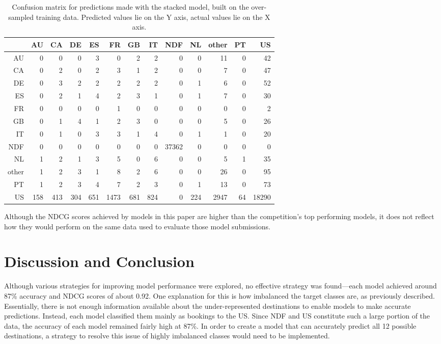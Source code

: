 \documentclass{article}
\begin{document}
\begin{table}[ht]
\centering
\begin{tabular}{r | rrrrrrrrrrrr}
 & AU & CA & DE & ES & FR & GB & IT & NDF & NL & other & PT & US \\ 
  \hline
  AU &   0 &   0 &   0 &   3 &   0 &   2 &   2 &   0 &   0 &  11 &   0 &  42 \\ 
  CA &   0 &   2 &   0 &   2 &   3 &   1 &   2 &   0 &   0 &   7 &   0 &  47 \\ 
  DE &   0 &   3 &   2 &   2 &   2 &   2 &   2 &   0 &   1 &   6 &   0 &  52 \\ 
  ES &   0 &   2 &   1 &   4 &   2 &   3 &   1 &   0 &   1 &   7 &   0 &  30 \\ 
  FR &   0 &   0 &   0 &   0 &   1 &   0 &   0 &   0 &   0 &   0 &   0 &   2 \\ 
  GB &   0 &   1 &   4 &   1 &   2 &   3 &   0 &   0 &   0 &   5 &   0 &  26 \\ 
  IT &   0 &   1 &   0 &   3 &   3 &   1 &   4 &   0 &   1 &   1 &   0 &  20 \\ 
  NDF &   0 &   0 &   0 &   0 &   0 &   0 &   0 & 37362 &   0 &   0 &   0 &   0 \\ 
  NL &   1 &   2 &   1 &   3 &   5 &   0 &   6 &   0 &   0 &   5 &   1 &  35 \\ 
  other &   1 &   2 &   3 &   1 &   8 &   2 &   6 &   0 &   0 &  26 &   0 &  95 \\ 
  PT &   1 &   2 &   3 &   4 &   7 &   2 &   3 &   0 &   1 &  13 &   0 &  73 \\ 
  US & 158 & 413 & 304 & 651 & 1473 & 681 & 824 &   0 & 224 & 2947 &  64 & 18290 \\
\end{tabular}
\caption{Confusion matrix for predictions made with the stacked model, built on the over-sampled training data. Predicted values lie on the Y axis, actual values lie on the X axis.}
\label{cm:stacked}
\end{table}

Although the NDCG scores achieved by models in this paper are higher than the competition's top performing models, it does not reflect how they would perform on the same data used to evaluate those model submissions. 

\section{Discussion and Conclusion}

Although various strategies for improving model performance were explored, no effective strategy was found---each model achieved around 87\% accuracy and NDCG scores of about 0.92. One explanation for this is how imbalanced the target classes are, as previously described. Essentially, there is not enough information available about the under-represented destinations to enable models to make accurate predictions. Instead, each model classified them mainly as bookings to the US. Since NDF and US constitute such a large portion of the data, the accuracy of each model remained fairly high at 87\%. In order to create a model that can accurately predict all 12 possible destinations, a strategy to resolve this issue of highly imbalanced classes would need to be implemented.
\end{document}
